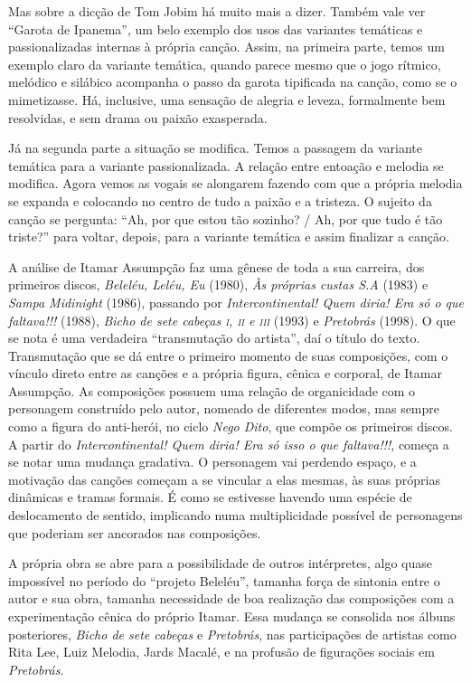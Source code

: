 Mas sobre a dicção de Tom Jobim há muito mais a dizer. Também vale ver
``Garota de Ipanema'', um belo exemplo dos usos das variantes temáticas e
passionalizadas internas à própria canção. Assim, na primeira parte,
temos um exemplo claro da variante temática, quando parece mesmo que o
jogo rítmico, melódico e silábico acompanha o passo da garota tipificada
na canção, como se o mimetizasse. Há, inclusive, uma sensação de alegria
e leveza, formalmente bem resolvidas, e sem drama ou paixão exasperada.

Já na segunda parte a situação se modifica. Temos a passagem da variante
temática para a variante passionalizada. A relação entre entoação e
melodia se modifica. Agora vemos as vogais se alongarem fazendo com que
a própria melodia se expanda e colocando no centro de tudo a paixão e a
tristeza. O sujeito da canção se pergunta: ``Ah, por que estou tão
sozinho? / Ah, por que tudo é tão triste?'' para voltar, depois, para a
variante temática e assim finalizar a canção.

A análise de Itamar Assumpção faz uma gênese de toda a sua carreira, dos
primeiros discos, \textit{Beleléu, Leléu, Eu} (1980), \textit{Às próprias custas \textsc{S.A}}
(1983) e \textit{Sampa Midinight} (1986), passando por \textit{Intercontinental! Quem
diria! Era só o que faltava!!!} (1988), \textit{Bicho de sete cabeças \textsc{i}, \textsc{ii} e \textsc{iii}}
(1993) e \textit{Pretobrás} (1998). O que se nota é uma verdadeira ``transmutação
do artista'', daí o título do texto. Transmutação que se dá entre o
primeiro momento de suas composições, com o vínculo direto entre as
canções e a própria figura, cênica e corporal, de Itamar Assumpção. As
composições possuem uma relação de organicidade com o personagem
construído pelo autor, nomeado de diferentes modos, mas sempre como a
figura do anti-herói, no ciclo \textit{Nego Dito}, que compõe os primeiros
discos. A partir do \textit{Intercontinental! Quem diria! Era só isso o que
faltava!!!}, começa a se notar uma mudança gradativa. O personagem vai
perdendo espaço, e a motivação das canções começam a se vincular a elas
mesmas, às suas próprias dinâmicas e tramas formais. É como se estivesse
havendo uma espécie de deslocamento de sentido, implicando numa
multiplicidade possível de personagens que poderiam ser ancorados nas
composições.

A própria obra se abre para a possibilidade de outros intérpretes, algo
quase impossível no período do ``projeto Beleléu'', tamanha força de
sintonia entre o autor e sua obra, tamanha necessidade de boa realização
das composições com a experimentação cênica do próprio Itamar. Essa
mudança se consolida nos álbuns posteriores, \textit{Bicho de sete cabeças} e
\textit{Pretobrás}, nas participações de artistas como Rita Lee, Luiz
Melodia, Jards Macalé, e na profusão de figurações sociais em \textit{Pretobrás}.

